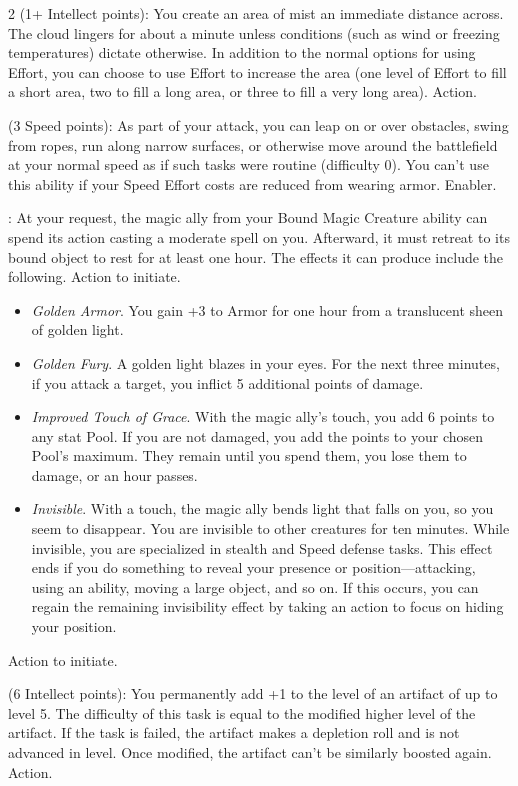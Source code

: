 \begin{multicols}{2}
 (1+ Intellect points): You create an area of mist an immediate distance across. The cloud lingers for about a minute unless conditions (such as wind or freezing temperatures) dictate otherwise. In addition to the normal options for using Effort, you can choose to use Effort to increase the area (one level of Effort to fill a short area, two to fill a long area, or three to fill a very long area). Action.

 (3 Speed points): As part of your attack, you can leap on or over obstacles, swing from ropes, run along narrow surfaces, or otherwise move around the battlefield at your normal speed as if such tasks were routine (difficulty 0). You can’t use this ability if your Speed Effort costs are reduced from wearing armor. Enabler. 
 
: At your request, the magic ally from your Bound Magic Creature ability can spend its action casting a moderate spell on you. Afterward, it must retreat to its bound object to rest for at least one hour. The effects it can produce include the following. Action to initiate. 

\begin{itemize}  
\item \textit{Golden Armor}. You gain +3 to Armor for one hour from a translucent sheen of golden light. 
\item \textit{Golden Fury}. A golden light blazes in your eyes. For the next three minutes, if you attack a target, you inflict 5 additional points of damage. 
\item \textit{Improved Touch of Grace}. With the magic ally’s touch, you add 6 points to any stat Pool. If you are not damaged, you add the points to your chosen Pool’s maximum. They remain until you spend them, you lose them to damage, or an hour passes. 
\item \textit{Invisible}. With a touch, the magic ally bends light that falls on you, so you seem to disappear. You are invisible to other creatures for ten minutes. While invisible, you are specialized in stealth and Speed defense tasks. This effect ends if you do something to reveal your presence or position—attacking, using an ability, moving a large object, and so on. If this occurs, you can regain the remaining invisibility effect by taking an action to focus on hiding your position. 
\end{itemize}
Action to initiate. 
 
 (6 Intellect points): You permanently add +1 to the level of an artifact of up to level 5. The difficulty of this task is equal to the modified higher level of the artifact. If the task is failed, the artifact makes a depletion roll and is not advanced in level. Once modified, the artifact can’t be similarly boosted again. Action. 


\end{multicols}
